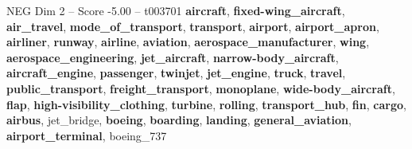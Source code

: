 \begin{textsample}{NEG Dim 2 – Score -5.00 – t003701}  \label{ex:f2_neg_007}
\textbf{aircraft}, \textbf{fixed-wing\_aircraft}, \textbf{air\_travel}, \textbf{mode\_of\_transport}, \textbf{transport}, \textbf{airport}, \textbf{airport\_apron}, \textbf{airliner}, \textbf{runway}, \textbf{airline}, \textbf{aviation}, \textbf{aerospace\_manufacturer}, \textbf{wing}, \textbf{aerospace\_engineering}, \textbf{jet\_aircraft}, \textbf{narrow-body\_aircraft}, \textbf{aircraft\_engine}, \textbf{passenger}, \textbf{twinjet}, \textbf{jet\_engine}, \textbf{truck}, \textbf{travel}, \textbf{public\_transport}, \textbf{freight\_transport}, \textbf{monoplane}, \textbf{wide-body\_aircraft}, \textbf{flap}, \textbf{high-visibility\_clothing}, \textbf{turbine}, \textbf{rolling}, \textbf{transport\_hub}, \textbf{fin}, \textbf{cargo}, \textbf{airbus}, jet\_bridge, \textbf{boeing}, \textbf{boarding}, \textbf{landing}, \textbf{general\_aviation}, \textbf{airport\_terminal}, boeing\_737

\end{textsample}
